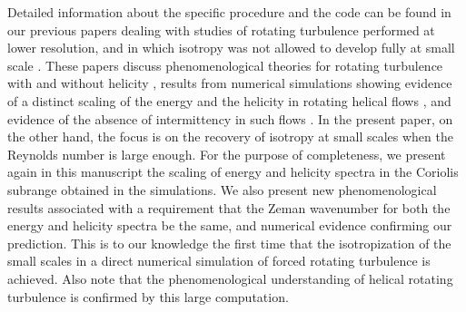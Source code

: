 \documentclass[aps,amsmath,amssymb,floatfix,showpacs]{revtex4}
\begin{document}
Detailed information about the specific procedure and the code can be found in our previous papers dealing with studies of rotating turbulence performed at lower resolution, and in which isotropy was not allowed to develop fully at small scale \citep{rot512,1536a,1536b,phil_trans}. These papers discuss phenomenological theories for rotating turbulence with and without helicity \citep{phil_trans}, results from numerical simulations showing evidence of a distinct scaling of the energy and the helicity in rotating helical flows \citep{rot512, 1536a}, and evidence of the absence of intermittency in such flows \citep{1536b}. In the present paper, on the other hand, the focus is on the recovery of isotropy at small scales when the Reynolds number is large enough. For the purpose of completeness, we present again in this manuscript the scaling of energy and helicity spectra in the Coriolis subrange obtained in the simulations. We also present new phenomenological results associated with a requirement that the Zeman wavenumber for both the energy and helicity spectra be the same, and numerical evidence confirming our prediction. This is to our knowledge the first time that the isotropization of the small scales in a direct numerical simulation of forced rotating turbulence is achieved. Also note that the phenomenological understanding of helical rotating turbulence is confirmed by this large computation.
\end{document}

